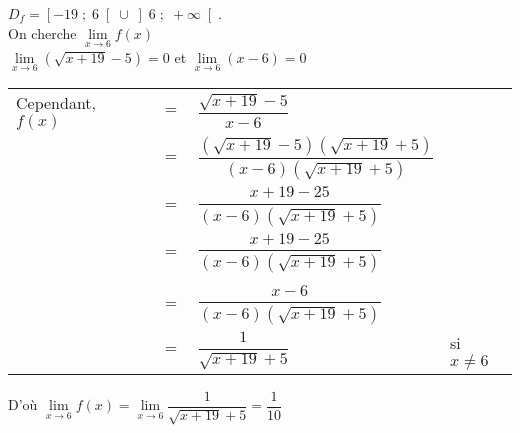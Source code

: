 $D_f = \left[-19 \; ; \; 6 \right[\cup \left]6 \; ; \; +\infty\right[$. \\

On cherche $\lim\limits_{x \to 6} f(x)$ \\

$\lim\limits_{x \to 6} \left(\sqrt{x + 19} - 5\right) = 0$ et $\lim\limits_{x \to 6} (x-6) = 0$ \\

\begin{tabular}{llll}
Cependant, $f(x)$ & $=$ & $\dfrac{\sqrt{x + 19} - 5}{x -6} $ & \vspace*{.3cm} \\
& $=$ & $\dfrac{\left(\sqrt{x + 19} - 5\right)\left(\sqrt{x + 19} + 5\right)}{\left(x-6\right)\left(\sqrt{x+19} + 5\right)}$ & \vspace*{.3cm} \\
& $=$ & $\dfrac{x + 19 - 25}{\left(x-6\right)\left(\sqrt{x+19} + 5\right)}$ & \vspace*{.3cm} \\
& $=$ & $\dfrac{x + 19 - 25}{\left(x-6\right)\left(\sqrt{x+19} + 5\right)}$ & \\
\vspace*{.3cm} \\
& $=$ & $\dfrac{x - 6}{\left(x-6\right)\left(\sqrt{x+19} + 5\right)}$ & \vspace*{.3cm} \\
& $=$ & $\dfrac{1}{\sqrt{x+19} + 5}$ & si $x \neq 6 $ \vspace*{.3cm} \\
\end{tabular}

D'où $\lim\limits_{x \to 6} f(x) = \lim\limits_{x \to 6} \dfrac{1}{\sqrt{x+19} + 5} = \dfrac{1}{10}$


\ifdefined\COMPLETE
\else
    
\fi